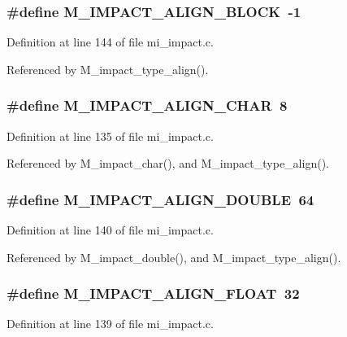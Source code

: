 \subsubsection{\setlength{\rightskip}{0pt plus 5cm}\#define M\_\-IMPACT\_\-ALIGN\_\-BLOCK~-1}\label{mi__impact_8c_d61d85c41eb0a0b1d03c9f6f2e66a12b}




Definition at line 144 of file mi\_\-impact.c.

Referenced by M\_\-impact\_\-type\_\-align().
\subsubsection{\setlength{\rightskip}{0pt plus 5cm}\#define M\_\-IMPACT\_\-ALIGN\_\-CHAR~8}\label{mi__impact_8c_ae114dbe6c6f2f9d0c0a48aa78f5f77f}




Definition at line 135 of file mi\_\-impact.c.

Referenced by M\_\-impact\_\-char(), and M\_\-impact\_\-type\_\-align().
\subsubsection{\setlength{\rightskip}{0pt plus 5cm}\#define M\_\-IMPACT\_\-ALIGN\_\-DOUBLE~64}\label{mi__impact_8c_f059efb1414f00bc58412de341c23f04}




Definition at line 140 of file mi\_\-impact.c.

Referenced by M\_\-impact\_\-double(), and M\_\-impact\_\-type\_\-align().
\subsubsection{\setlength{\rightskip}{0pt plus 5cm}\#define M\_\-IMPACT\_\-ALIGN\_\-FLOAT~32}\label{mi__impact_8c_27490f4ed7fb1d774eca72fceb8cdd38}




Definition at line 139 of file mi\_\-impact.c.


